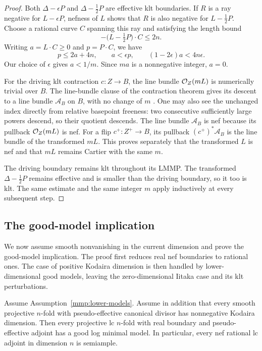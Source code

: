 \begin{proof}
Both \(\Delta-\epsilon P\) and \(\Delta-\tfrac12P\) are
effective klt boundaries. If \(R\) is a ray negative for
\(L-\epsilon P\), nefness of \(L\) shows that \(R\) is also
negative for \(L-\tfrac12P\).
Choose a rational curve \(C\) spanning this ray and satisfying
the length bound
\[
 -\bigl(L-\tfrac12P\bigr)\cdot C\leq 2n.
\]
Writing \(a=L\cdot C\geq 0\) and \(p=P\cdot C\), we have
\[
 p\leq 2a+4n,\qquad a<\epsilon p,
 \qquad
 (1-2\epsilon)a<4n\epsilon.
\]
Our choice of \(\epsilon\) gives \(a<1/m\).
Since \(ma\) is a nonnegative integer, \(a=0\).

For the driving klt contraction $c:Z\to B$, the line bundle
\(\mathcal{O}_Z(mL)\) is numerically trivial over $B$.
The line-bundle clause of the contraction theorem gives its
descent to a line bundle $\mathcal A_B$ on $B$, with no change of \(m\)
\cite[Theorem~3.74(3)]{Fujino2017}.
One may also see the unchanged index directly from relative
basepoint freeness: two consecutive sufficiently large powers
descend, so their quotient descends.
The line bundle $\mathcal A_B$ is nef because its pullback
$\mathcal{O}_Z(mL)$ is nef. For a flip $c^+:Z^+\to B$, its pullback
$(c^+)^*\mathcal A_B$ is the line bundle of the transformed
$mL$. This proves separately that the transformed $L$ is nef
and that $mL$ remains Cartier with the same $m$.

The driving boundary remains klt throughout its LMMP.
The transformed \(\Delta-\tfrac12P\) remains effective and
is smaller than the driving boundary, so it too is klt.
The same estimate and the same integer \(m\) apply inductively
at every subsequent step.
\end{proof}

\subsection{The good-model implication}

We now assume smooth nonvanishing in the current dimension and prove the
good-model implication. The proof first reduces real nef boundaries to
rational ones. The case of positive
Kodaira dimension is then handled by lower-dimensional good models, leaving the
zero-dimensional Iitaka case and its klt perturbations.

\begin{proposition}
\label{prop:inductive-reduction}
Assume Assumption~\ref{mmp:lower-models}. Assume in addition that
every smooth projective \(n\)-fold with pseudo-effective
canonical divisor has nonnegative Kodaira dimension.
Then every projective lc \(n\)-fold with real boundary and
pseudo-effective adjoint has a good log minimal model.
In particular, every nef rational lc adjoint in dimension \(n\)
is semiample.
\end{proposition}

